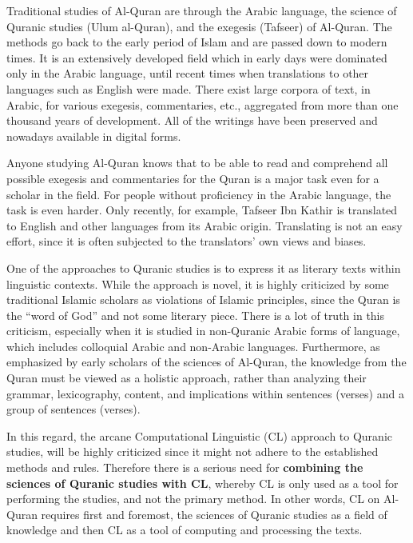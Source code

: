 \documentclass[
]{article}
\begin{document}
Traditional studies of Al-Quran are through the Arabic language, the science of Quranic studies (Ulum al-Quran), and the exegesis (Tafseer) of Al-Quran. The methods go back to the early period of Islam and are passed down to modern times. It is an extensively developed field which in early days were dominated only in the Arabic language, until recent times when translations to other languages such as English were made. There exist large corpora of text, in Arabic, for various exegesis, commentaries, etc., aggregated from more than one thousand years of development. All of the writings have been preserved and nowadays available in digital forms.

Anyone studying Al-Quran knows that to be able to read and comprehend all possible exegesis and commentaries for the Quran is a major task even for a scholar in the field. For people without proficiency in the Arabic language, the task is even harder. Only recently, for example, Tafseer Ibn Kathir is translated to English and other languages from its Arabic origin. Translating is not an easy effort, since it is often subjected to the translators' own views and biases.

One of the approaches to Quranic studies is to express it as literary texts within linguistic contexts. While the approach is novel, it is highly criticized by some traditional Islamic scholars as violations of Islamic principles, since the Quran is the ``word of God'' and not some literary piece. There is a lot of truth in this criticism, especially when it is studied in non-Quranic Arabic forms of language, which includes colloquial Arabic and non-Arabic languages. Furthermore, as emphasized by early scholars of the sciences of Al-Quran, the knowledge from the Quran must be viewed as a holistic approach, rather than analyzing their grammar, lexicography, content, and implications within sentences (verses) and a group of sentences (verses).

In this regard, the arcane Computational Linguistic (CL) approach to Quranic studies, will be highly criticized since it might not adhere to the established methods and rules. Therefore there is a serious need for \textbf{combining the sciences of Quranic studies with CL}, whereby CL is only used as a tool for performing the studies, and not the primary method. In other words, CL on Al-Quran requires first and foremost, the sciences of Quranic studies as a field of knowledge and then CL as a tool of computing and processing the texts.
\end{document}
